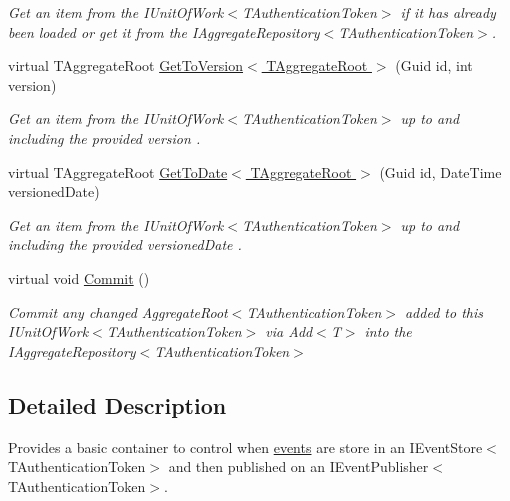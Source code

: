 \begin{DoxyCompactItemize}
\begin{DoxyCompactList}\small\item\em Get an item from the I\+Unit\+Of\+Work$<$\+T\+Authentication\+Token$>$ if it has already been loaded or get it from the I\+Aggregate\+Repository$<$\+T\+Authentication\+Token$>$. \end{DoxyCompactList}\item 
virtual T\+Aggregate\+Root \hyperlink{classCqrs_1_1Domain_1_1UnitOfWork_aa0e705ac7f323abfb552bcbce2a7d692_aa0e705ac7f323abfb552bcbce2a7d692}{Get\+To\+Version$<$ T\+Aggregate\+Root $>$} (Guid id, int version)
\begin{DoxyCompactList}\small\item\em Get an item from the I\+Unit\+Of\+Work$<$\+T\+Authentication\+Token$>$ up to and including the provided {\itshape version} . \end{DoxyCompactList}\item 
virtual T\+Aggregate\+Root \hyperlink{classCqrs_1_1Domain_1_1UnitOfWork_ac5f0efae335bee99f820d1c53b3e9f93_ac5f0efae335bee99f820d1c53b3e9f93}{Get\+To\+Date$<$ T\+Aggregate\+Root $>$} (Guid id, Date\+Time versioned\+Date)
\begin{DoxyCompactList}\small\item\em Get an item from the I\+Unit\+Of\+Work$<$\+T\+Authentication\+Token$>$ up to and including the provided {\itshape versioned\+Date} . \end{DoxyCompactList}\item 
virtual void \hyperlink{classCqrs_1_1Domain_1_1UnitOfWork_a132dd26611fc71d676727f71f1412edd_a132dd26611fc71d676727f71f1412edd}{Commit} ()
\begin{DoxyCompactList}\small\item\em Commit any changed Aggregate\+Root$<$\+T\+Authentication\+Token$>$ added to this I\+Unit\+Of\+Work$<$\+T\+Authentication\+Token$>$ via Add$<$\+T$>$ into the I\+Aggregate\+Repository$<$\+T\+Authentication\+Token$>$ \end{DoxyCompactList}\end{DoxyCompactItemize}


\subsection{Detailed Description}
Provides a basic container to control when \hyperlink{}{events} are store in an I\+Event\+Store$<$\+T\+Authentication\+Token$>$ and then published on an I\+Event\+Publisher$<$\+T\+Authentication\+Token$>$. 

